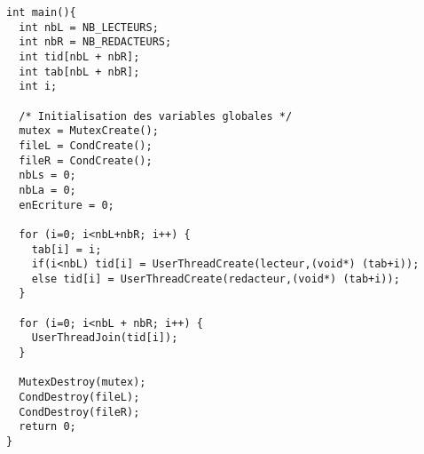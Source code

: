 \documentclass[11pt]{article}
\theoremstyle{definition}
\theoremstyle{definition}
\begin{document}
\begin{lstlisting}[columns=fixed,basicstyle=\small\ttfamily]
int main(){
  int nbL = NB_LECTEURS;
  int nbR = NB_REDACTEURS;
  int tid[nbL + nbR];
  int tab[nbL + nbR];
  int i;

  /* Initialisation des variables globales */
  mutex = MutexCreate();
  fileL = CondCreate();
  fileR = CondCreate();
  nbLs = 0;
  nbLa = 0;
  enEcriture = 0;

  for (i=0; i<nbL+nbR; i++) {
    tab[i] = i;
    if(i<nbL) tid[i] = UserThreadCreate(lecteur,(void*) (tab+i));
    else tid[i] = UserThreadCreate(redacteur,(void*) (tab+i));
  }

  for (i=0; i<nbL + nbR; i++) {
    UserThreadJoin(tid[i]);
  }

  MutexDestroy(mutex);
  CondDestroy(fileL);
  CondDestroy(fileR);
  return 0;
}
\end{lstlisting}
\end{document}
